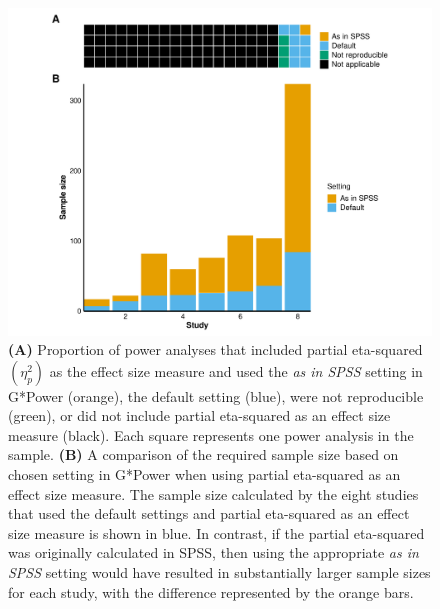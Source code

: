 \documentclass[
  man, donotrepeattitle,mask,floatsintext]{apa7}
\begin{document}
\clearpage

\begin{figure}

{\centering \includegraphics{../../figs/fig3} 

}

\caption{\normalfont
\textbf{(A)} Proportion of power analyses that included partial eta-squared \((\eta_{p}^2)\) as the effect size measure and used the \emph{as in SPSS} setting in G*Power (orange), the default setting (blue), were not reproducible (green), or did not include partial eta-squared as an effect size measure (black). Each square represents one power analysis in the sample. \textbf{(B)} A comparison of the required sample size based on chosen setting in G*Power when using partial eta-squared as an effect size measure. The sample size calculated by the eight studies that used the default settings and partial eta-squared as an effect size measure is shown in blue. In contrast, if the partial eta-squared was originally calculated in SPSS, then using the appropriate \emph{as in SPSS} setting would have resulted in substantially larger sample sizes for each study, with the difference represented by the orange bars.}\label{fig:fig3}
\end{figure}




\clearpage
\end{document}
